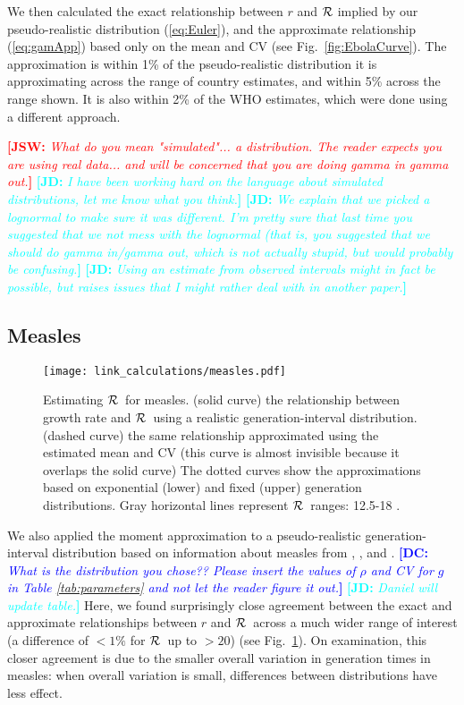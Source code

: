 \documentclass[12pt]{article}
\newcommand{\RR}{\ensuremath{{\cal R}}}
\newcommand{\eref}[1]{(\ref{eq:#1})}
\newcommand{\fref}[1]{Fig.~\ref{fig:#1}}
\newcommand{\comment}[3]{\textcolor{#1}{\textbf{[#2: }\textit{#3}\textbf{]}}}
\newcommand{\jd}[1]{\comment{cyan}{JD}{#1}}
\newcommand{\dc}[1]{\comment{blue}{DC}{#1}}
\newcommand{\jsw}[1]{\comment{red}{JSW}{#1}}
\begin{document}
We then calculated the exact relationship between $r$ and $\RR$ implied by our pseudo-realistic distribution \eref{Euler}, and the approximate relationship \eref{gamApp} based only on the mean and CV (see \fref{EbolaCurve}). The approximation is within 1\% of the pseudo-realistic distribution it is approximating across the range of country estimates, and within 5\% across the range shown. It is also within 2\% of the WHO estimates, which were done using a different approach. 

\jsw{What do you mean "simulated"... a distribution. The reader expects you are using real data... and will be concerned that you are doing gamma in gamma out.}
\jd{I have been working hard on the language about simulated distributions, let me know what you think.}
\jd{We explain that we picked a lognormal to make sure it was different. I'm pretty sure that last time you suggested that we not mess with the lognormal (that is, you suggested that we \emph{should} do gamma in/gamma out, which is not actually stupid, but would probably be confusing.}
\jd{Using an estimate from observed intervals might in fact be possible, but raises issues that I might rather deal with in another paper.}

\subsection{Measles}
\label{MeaslesEx}

\begin{figure}[htbp] \centering
	\texttt{[image: link\_calculations/measles.pdf]}
	\caption{Estimating \RR~for measles.
		(solid curve) the relationship between growth rate and \RR~using a realistic generation-interval distribution.
		(dashed curve) the same relationship approximated using the estimated mean and CV (this curve is almost invisible because it overlaps the solid curve)
		The dotted curves show the approximations based on exponential (lower) and fixed (upper) generation distributions.
		Gray horizontal lines represent \RR\ ranges: 12.5-18 \cite{anderson1982directly}.
	}
	\label{fig:measlesCurve}
\end{figure}

We also applied the moment approximation to a pseudo-realistic generation-interval distribution based on information about measles from \cite{LessReic09}, \cite{Lloy01}, and \cite{anderson1982directly}. 
\dc{What is the distribution you chose?? Please insert the values of $\rho$ and CV for $g$ in Table \ref{tab:parameters} and not let the reader figure it out.}
\jd{Daniel will update table.}
Here, we found surprisingly close agreement between the exact and approximate relationships between $r$ and \RR\ across a much wider range of interest (a difference of $<1\%$ for \RR\ up to $>20$) (see \fref{measlesCurve}).
On examination, this closer agreement is due to the smaller overall variation in generation times in measles: when overall variation is small, differences between distributions have less effect.
\end{document}

